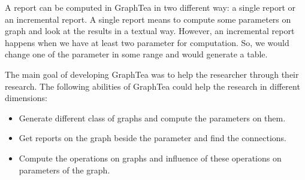 \documentclass[12pt, oneside]{book}
\begin{document}
A report can be computed in GraphTea in two different way:
a single report or an incremental report.
A single report means to compute some parameters on graph and look at the results
in a textual way. However, an incremental report happens when we have at least 
two parameter for computation. So, we would change one of the parameter in
some range and would generate a table.

The main goal of developing GraphTea was to help the researcher through their research.
The following abilities of GraphTea could help the research in different dimensions:
\begin{itemize}
\item Generate different class of graphs and compute the parameters on them.
\item Get reports on the graph beside the parameter and find the connections.
\item Compute the operations on graphs and influence of these operations on parameters
of the graph. 
\end{itemize}
\end{document}
